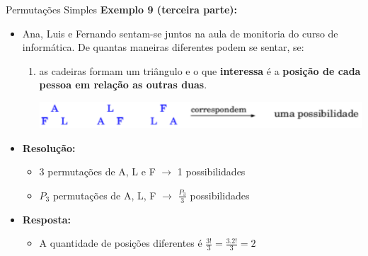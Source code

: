 \documentclass[aspectratio=169]{beamer}
\begin{document}
\begin{frame}{Permutações Simples}
    \textbf{Exemplo 9 (terceira parte):}

    \vspace{2mm}

    \begin{itemize}
        \item[] Ana, Luis e Fernando sentam-se juntos na aula de monitoria do curso de informática. De quantas maneiras diferentes podem se sentar, se:
        \begin{enumerate}[(3)]
            \item as cadeiras formam um triângulo e o que \textbf{interessa} é a \textbf{posição de cada pessoa em relação as outras duas}.
            \begin{center}
                \includegraphics[width=0.8\linewidth]{figs/Exemplo9_5.png}
            \end{center}
        \end{enumerate}
        \pause 
        \item[] \textbf{Resolução:} 
        \begin{itemize}
            \item 3 permutações de A, L e F $\rightarrow $ 1 possibilidades \pause
            \item $P_3$ permutações de A, L, F $\rightarrow $ $\frac{P_3}{3}$ possibilidades
        \end{itemize}
        \pause 
        \item[] \textbf{Resposta:} 
        \begin{itemize}
            \item[] A quantidade de posições diferentes é $\frac{3!}{3} = \frac{3 . 2!}{3} = 2$
        \end{itemize}
    \end{itemize}
\end{frame}
\end{document}
